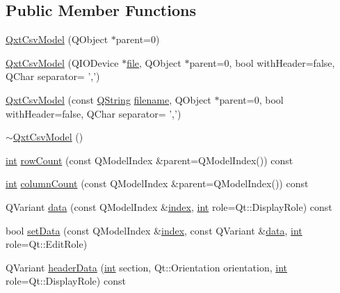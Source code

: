 \subsection*{Public Member Functions}
\begin{DoxyCompactItemize}
\item 
\hyperlink{class_qxt_csv_model_a9056b197692dc53dc666272b36d69b69}{Qxt\-Csv\-Model} (Q\-Object $\ast$parent=0)
\item 
\hyperlink{class_qxt_csv_model_a9fd8d7f8c4e266ffcb1b7de1b573e850}{Qxt\-Csv\-Model} (Q\-I\-O\-Device $\ast$\hyperlink{uavobjecttemplate_8m_a97c04efa65bcf0928abf9260bc5cbf46}{file}, Q\-Object $\ast$parent=0, bool with\-Header=false, Q\-Char separator= ',')
\item 
\hyperlink{class_qxt_csv_model_a66d4dfa8bd58d57761271b623665c14c}{Qxt\-Csv\-Model} (const \hyperlink{group___u_a_v_objects_plugin_gab9d252f49c333c94a72f97ce3105a32d}{Q\-String} \hyperlink{ioapi_8h_a7a03a664b090ce5c848ecb31cb4a2fa8}{filename}, Q\-Object $\ast$parent=0, bool with\-Header=false, Q\-Char separator= ',')
\item 
\hyperlink{class_qxt_csv_model_a020d5314289b05df0a0f0ead546bfbcc}{$\sim$\-Qxt\-Csv\-Model} ()
\item 
\hyperlink{ioapi_8h_a787fa3cf048117ba7123753c1e74fcd6}{int} \hyperlink{class_qxt_csv_model_a124d7162c7e54ebcd5e0412eddf26cdf}{row\-Count} (const Q\-Model\-Index \&parent=Q\-Model\-Index()) const 
\item 
\hyperlink{ioapi_8h_a787fa3cf048117ba7123753c1e74fcd6}{int} \hyperlink{class_qxt_csv_model_a4724dac13f4846f0a267f972cbbf6232}{column\-Count} (const Q\-Model\-Index \&parent=Q\-Model\-Index()) const 
\item 
Q\-Variant \hyperlink{class_qxt_csv_model_a41e56375b9feed3286f4038056409be9}{data} (const Q\-Model\-Index \&\hyperlink{glext_8h_ab47dd9958bcadea08866b42bf358e95e}{index}, \hyperlink{ioapi_8h_a787fa3cf048117ba7123753c1e74fcd6}{int} role=Qt\-::\-Display\-Role) const 
\item 
bool \hyperlink{class_qxt_csv_model_a31f44c022e93bd7c4aed50e694cd42f7}{set\-Data} (const Q\-Model\-Index \&\hyperlink{glext_8h_ab47dd9958bcadea08866b42bf358e95e}{index}, const Q\-Variant \&\hyperlink{glext_8h_a8850df0785e6fbcc2351af3b686b8c7a}{data}, \hyperlink{ioapi_8h_a787fa3cf048117ba7123753c1e74fcd6}{int} role=Qt\-::\-Edit\-Role)
\item 
Q\-Variant \hyperlink{class_qxt_csv_model_a42544aa44336b4b6d4f0c69c2f010310}{header\-Data} (\hyperlink{ioapi_8h_a787fa3cf048117ba7123753c1e74fcd6}{int} section, Qt\-::\-Orientation orientation, \hyperlink{ioapi_8h_a787fa3cf048117ba7123753c1e74fcd6}{int} role=Qt\-::\-Display\-Role) const 

\end{DoxyCompactItemize}
